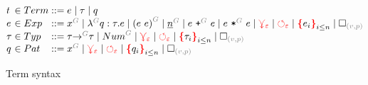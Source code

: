 \documentclass[nonacm, acmsmall, screen, review]{acmart}
\newcommand{\e}{\varepsilon}
\newcommand{\id}[1]{\textcolor{gray}{\ensuremath{#1}}}
\newcommand{\eid}[2]{{#2}^{\id{#1}}}
\newcommand{\conflictHole}[1]{%
{\noexpandarg\StrSubstitute{#1}{,}{\textcolor{red}{\,\textbf{|}\,}}[\myargs]%
{\textcolor{red}{\textbf{\{}}\myargs\textcolor{red}{\textbf{\}}}}}}%
\newcommand{\emptyHole}[2]{\square_{\id{(#1, #2)}}}
\newcommand{\eVar}[2]{\eid{#1}{#2}}
\newcommand{\eFun}[4]{\eid{#1}{\lambda} #2 : #3 . #4}
\newcommand{\eApp}[3]{\eid{#1}{\left(#2~#3\right)}}
\newcommand{\eNum}[2]{\eid{#1}{\underline{#2}}}
\newcommand{\ePlus}[3]{#2~\eid{#1}{\texttt{+}}~#3}
\newcommand{\eTimes}[3]{#2~\eid{#1}{\texttt{*}}~#3}
\newcommand{\pVar}[2]{\eid{#1}{#2}}
\newcommand{\tArrow}[3]{#2 \eid{#1}{\rightarrow} #3}
\newcommand{\tNum}[1]{\eid{#1}{Num}}
\newcommand{\multiVertex}[1]{\textcolor{red}{\ensuremath{\curlyveedownarrow_{#1}}}}
\newcommand{\cycleVertex}[1]{\textcolor{red}{\ensuremath{\circlearrowleft_{#1}}}}
\begin{document}


\begin{figure}
  \[
    \arraycolsep=0pt
    \begin{array}{lcllll}
      t & {}\in{} & Term & {}::={} &
        e
        \mid \tau
        \mid q
      \\
      e & {}\in{} & Exp & {}::={} &
        \eVar{G}{x}
        \mid \eFun{G}{q}{\tau}{e}
        \mid \eApp{G}{e}{e}
        \mid \eNum{G}{n}
        \mid \ePlus{G}{e}{e}
        \mid \eTimes{G}{e}{e}
        \mid \multiVertex{\e}
        \mid \cycleVertex{\e}
        \mid \conflictHole{e_i}_{i \leq n}
        \mid \emptyHole{v}{p}
      \\
      \tau & {}\in{} & Typ & {}::={} &
        \tArrow{G}{\tau}{\tau}
        \mid \tNum{G}
        \mid \multiVertex{\e}
        \mid \cycleVertex{\e}
        \mid \conflictHole{\tau_i}_{i \leq n}
        \mid \emptyHole{v}{p}
      \\
      q & {}\in{} & Pat{} & {}::={} &
        \pVar{G}{x}
        \mid \multiVertex{\e}
        \mid \cycleVertex{\e}
        \mid \conflictHole{q_i}_{i \leq n}
        \mid \emptyHole{v}{p}
      \\
    \end{array}
  \]  
  \caption{Term syntax}
  \label{fig:Term syntax}
\end{figure}%



\end{document}
